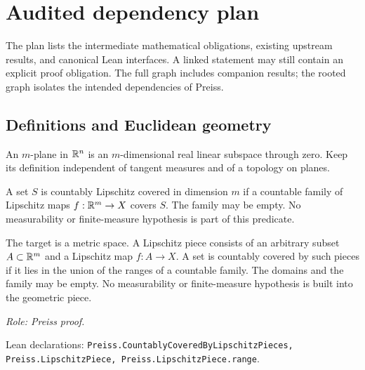 \chapter{Audited dependency plan}

The plan lists the intermediate mathematical obligations, existing upstream results, and canonical Lean interfaces. A linked statement may still contain an explicit proof obligation. The full graph includes companion results; the rooted graph isolates the intended dependencies of Preiss.


\section{Definitions and Euclidean geometry}

\begin{definition}
\label{def:plane}





An $m$-plane in $\mathbb R^n$ is an $m$-dimensional real linear subspace through zero.
Keep its definition independent of tangent measures and of a topology on planes.
\end{definition}

\begin{definition}
\label{def:coverage}





A set $S$ is countably Lipschitz covered in dimension $m$ if a countable
family of Lipschitz maps $f:\mathbb R^m\to X$ covers $S$. The family may be empty.
No measurability or finite-measure hypothesis is part of this predicate.
\end{definition}

\begin{definition}
\label{def:parametrized-coverage}





The target is a metric space.
A Lipschitz piece consists of an arbitrary subset $A\subset\mathbb R^m$ and a Lipschitz map $f:A\to X$. A set is countably covered by such pieces if it lies in the union of the ranges of a countable family. The domains and the family may be empty. No measurability or finite-measure hypothesis is built into the geometric piece.
\par\emph{Role: Preiss proof.}
\par Lean declarations: \texttt{Preiss.CountablyCoveredByLipschitzPieces, Preiss.LipschitzPiece, Preiss.LipschitzPiece.range}.
\end{definition}

